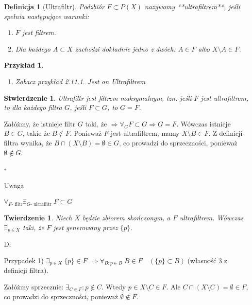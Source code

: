 \documentclass[12pt,a4paper]{article}
\newcounter{twierdzenie}
\theoremstyle{break}
\newtheorem{definition}{Definicja}[section]
\newtheorem{theorem}{Twierdzenie}[section]
\newtheorem{example}{Przykład}[section]
\newtheorem{stwierdzenie}{Stwierdzenie}[section]
\begin{document}
			\begin{definition}[Ultrafiltr]
				Podzbiór $F \subset P(X)$ nazywamy **ultrafiltrem**, jeśli spełnia następujące warunki:
				\begin{enumerate}[1)]
					\item $F$ jest filtrem.
					\item Dla każdego $A \subset X$ zachodzi dokładnie jedno z dwóch: $A \in F$ albo $X \setminus A \in F$.
				\end{enumerate}
			\end{definition}
			
			\begin{example}
				\begin{enumerate}[1.]
					\item Zobacz przykład 2.11.1. Jest on Ultrafiltrem
				\end{enumerate}
			\end{example}
			
			\begin{stwierdzenie}
				Ultrafiltr jest filtrem maksymalnym, tzn. jeśli $F$ jest ultrafiltrem, to dla każdego filtra $G$, jeśli $F \subset G$, to $G = F$.
			\end{stwierdzenie}
			
				Załóżmy, że istnieje filtr $G$ taki, że $\Rightarrow \forall_G F\subset G \Rightarrow G=F$. Wówczas istnieje $B \in G$, takie że $B \notin F$. Ponieważ $F$ jest ultrafiltrem, mamy $X \setminus B \in F$.  
				Z definicji filtra wynika, że $B \cap (X \setminus B) = \emptyset \in G$, co prowadzi do sprzeczności, ponieważ $\emptyset \notin G$.
			
	\begin{flushright}$\square$\end{flushright}
	Uwaga
	
	$\forall_{F \text{- filtr}} \exists_{G \text{- ultrafiltr}} \; F \subset G$
	
	\begin{theorem}
		Niech $X$ będzie zbiorem skończonym, a $F$ ultrafiltrem. Wówczas $\exists_{p \in X}$ taki, że $F$ jest generowany przez $\{p\}$.
	\end{theorem}
	
	D: 
	
	Przypadek 1) $\exists_{p \in X} \; \{p\} \in F$  
	$\Rightarrow \forall_{B : p \in B} \; B \in F \quad (\{p\} \subset B)$ (własność 3 z definicji filtra).  
	
	Załóżmy sprzecznie: $\exists_{C \in F} : p \notin C$.  
	Wtedy $p \in X \setminus C \in F$.  
	Ale $C \cap (X \setminus C) = \emptyset \in F$, co prowadzi do sprzeczności, ponieważ $\emptyset \notin F$.
	
\end{document}
